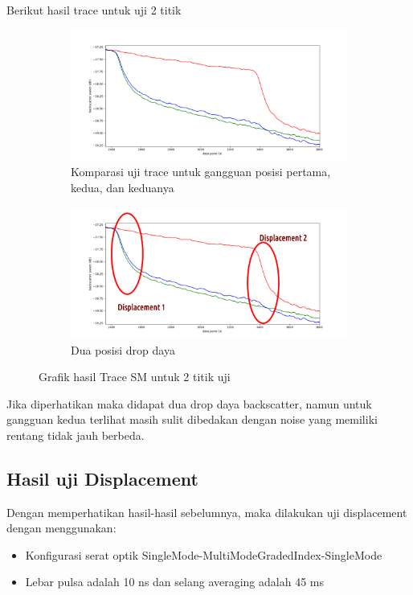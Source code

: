 \documentclass[12pt]{article}
\begin{document}
	Berikut hasil trace untuk uji 2 titik
	
	\begin{figure}[!ht]
		\centering
		\captionsetup{justification=centering}
		\begin{subfigure}[h]{\textwidth}
			\includegraphics[width=\textwidth]{images/Bab_4/smsm}	
			\caption{\small{Komparasi uji trace untuk gangguan posisi pertama, kedua, dan keduanya}}		
		\end{subfigure}
		\begin{subfigure}[h]{0.8\textwidth}
			\includegraphics[width=\linewidth]{images/Bab_4/smsm2}
			\caption{\small{Dua posisi drop daya}}			
		\end{subfigure}
		\caption[Uji Pagar]{\small{Grafik hasil Trace SM untuk 2 titik uji}}
	\end{figure}

	Jika diperhatikan maka didapat dua drop daya backscatter, namun untuk gangguan kedua terlihat masih sulit dibedakan dengan noise yang memiliki rentang tidak jauh berbeda.

		
	\newpage
	
	\subsection{Hasil uji Displacement}
	Dengan memperhatikan hasil-hasil sebelumnya, maka dilakukan uji displacement dengan menggunakan:
	\begin{itemize}
		\item Konfigurasi serat optik SingleMode-MultiModeGradedIndex-SingleMode
		\item Lebar pulsa adalah 10 ns dan selang averaging adalah 45 ms
	\end{itemize}
\end{document}
